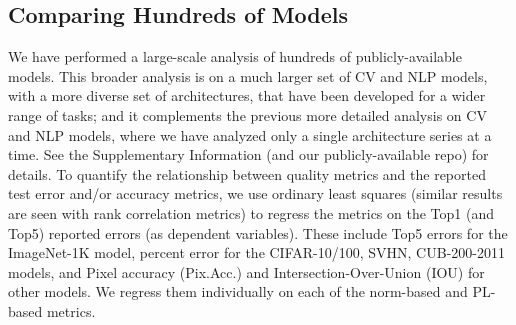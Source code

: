 \subsection{Comparing Hundreds of Models}
\label{sxn:all_cv_models}

We have performed a large-scale analysis of hundreds of publicly-available models.
This broader analysis is on a much larger set of CV and NLP models, with a more diverse set of architectures, that have been developed for a wider range of tasks; and it complements the previous more detailed analysis on CV and NLP models, where we have analyzed only a single architecture series at a time.
See the Supplementary Information
(and our publicly-available repo)
for details.
To quantify the relationship between quality metrics and the reported test error and/or accuracy metrics, we use ordinary least squares (similar results are seen with rank correlation metrics) to regress the metrics on the Top1 (and Top5) reported errors (as dependent variables).
These include Top5 errors for the ImageNet-1K model, percent error for the CIFAR-10/100, SVHN, CUB-200-2011 models, and Pixel accuracy (Pix.Acc.) and Intersection-Over-Union (IOU) for other models.
We regress them individually on each of the norm-based and PL-based metrics.


